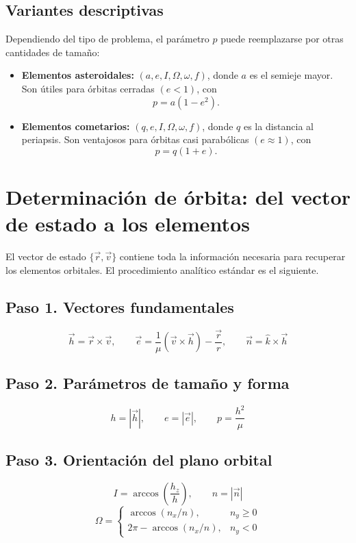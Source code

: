 \subsection{Variantes descriptivas}
Dependiendo del tipo de problema, el parámetro \(p\) puede reemplazarse por otras cantidades de tamaño:
\begin{itemize}
    \item \textbf{Elementos asteroidales:} \((a, e, I, \Omega, \omega, f)\), donde \(a\) es el semieje mayor. Son útiles para órbitas cerradas \((e<1)\), con
\[
 p = a(1-e^2).
\]
    \item \textbf{Elementos cometarios:} \((q, e, I, \Omega, \omega, f)\), donde \(q\) es la distancia al periapsis. Son ventajosos para órbitas casi parabólicas \((e\approx 1)\), con
\[
 p = q(1+e).
\]
\end{itemize}

\section{Determinación de órbita: del vector de estado a los elementos}
El vector de estado \(\{\vec{r},\vec{v}\}\) contiene toda la información necesaria para recuperar los elementos orbitales. El procedimiento analítico estándar es el siguiente.

\subsection{Paso 1. Vectores fundamentales}
\[
\vec{h} = \vec{r} \times \vec{v}, \qquad
\vec{e} = \frac{1}{\mu}(\vec{v} \times \vec{h}) - \frac{\vec{r}}{r}, \qquad
\vec{n} = \hat{k} \times \vec{h}
\]

\subsection{Paso 2. Parámetros de tamaño y forma}
\[
 h = |\vec{h}|, \qquad e = |\vec{e}|, \qquad p = \frac{h^2}{\mu}
\]

\subsection{Paso 3. Orientación del plano orbital}
\[
 I = \arccos\left(\frac{h_z}{h}\right), \qquad n = |\vec{n}|
\]
\[
\Omega =
\begin{cases}
\arccos(n_x/n), & n_y \ge 0 \\
2\pi - \arccos(n_x/n), & n_y < 0
\end{cases}
\]

